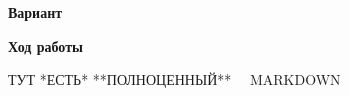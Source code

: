 \begin{center}
    \textbf{Вариант \LabVariant}
\end{center}
\begin{markdown}
\end{markdown}
\begin{center}
    \textbf{Ход работы}
\end{center}
\begin{markdown}
ТУТ *ЕСТЬ* **ПОЛНОЦЕННЫЙ** ~~MARKDOWN~~
\end{markdown}
